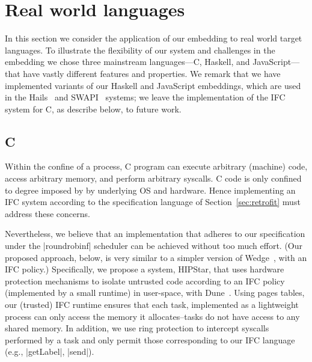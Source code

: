 \section{Real world languages}
\label{sec:real}

In this section we consider the application of our embedding to 
real world target languages.
%
To illustrate the flexibility of our system and challenges in the
embedding we chose three mainstream languages---C, Haskell, and
JavaScript---that have vastly different features and properties.
%
We remark that we have implemented variants of our Haskell and
JavaScript embeddings, which are used in the Hails~\tocite{} and
SWAPI~\tocite{} systems; we leave the implementation of the IFC system
for C, as describe below, to future work.

\subsection{C}
\label{sec:real:c}
%
Within the confine of a process, C program can execute arbitrary
(machine) code, access arbitrary memory, and perform arbitrary
syscalls.
%
C code is only confined to degree imposed by by underlying OS and
hardware.
%
Hence implementing an IFC system according to the specification
language of Section~\ref{sec:retrofit} must address these concerns.

Nevertheless, we believe that an implementation that adheres to our
specification under the |roundrobinf| scheduler can be achieved
without too much effort.
%
(Our proposed approach, below, is very similar to a simpler version of
Wedge~\tocite{}, with an IFC policy.)
%
Specifically, we propose a system, HIPStar, that uses hardware
protection mechanisms to isolate untrusted code according to an IFC
policy (implemented by a small runtime) in user-space, with
Dune~\tocite{}.
%
Using pages tables, our (trusted) IFC runtime ensures that each task,
implemented as a lightweight process can only access the memory it
allocates--tasks do not have access to any shared memory.
%
In addition, we use ring protection to intercept syscalls performed by
a task and only permit those corresponding to our IFC language (e.g.,
|getLabel|, |send|).
%


